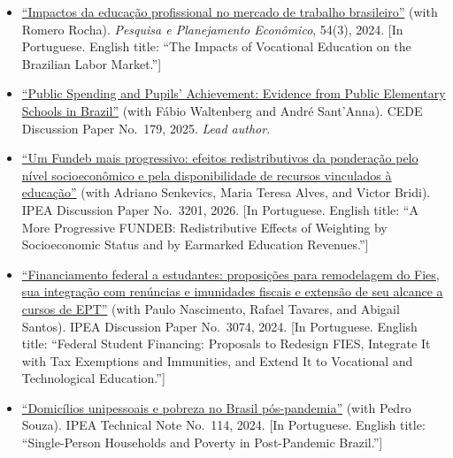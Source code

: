 \documentclass[11pt]{article}
\newenvironment{pubs}
  {\begin{itemize}[leftmargin=1.5em,labelsep=0em,label={},itemsep=6pt,parsep=0pt,topsep=2pt]
   \setlength{\itemindent}{-1.5em}}
  {\end{itemize}}
\begin{document}
\begin{pubs}
  \item \href{https://ppe.ipea.gov.br/index.php/ppe/article/view/2347}{``Impactos da educação profissional no mercado de trabalho brasileiro''}
        (with Romero Rocha). \textit{Pesquisa e Planejamento Econômico}, 54(3), 2024.
        {\small [In Portuguese. English title: ``The Impacts of Vocational Education on the Brazilian
        Labor Market.'']}
  \item \href{https://www.ie.ufrj.br/images/IE/grupos/cede/tds/\%5bTD\%20179\%5d\%20MACIEL,\%20B.\%20F._\%20SANT'ANNA,\%20A.A._\%20WALTENBERG,\%20F.(2025).\%20Public\%20spending\%20and\%20pupils\%E2\%80\%99\%20achievement_\%20Evidence\%20from\%20public\%20elementary\%20schools\%20in\%20Brazil.pdf}{``Public Spending and Pupils' Achievement: Evidence from Public Elementary Schools in Brazil''}
        (with Fábio Waltenberg and André Sant'Anna). CEDE Discussion Paper No.\ 179, 2025.
        \textit{Lead author.}
  \item \href{https://repositorio.ipea.gov.br/entities/publication/3bdf95c0-b7ce-4535-8897-84e6aaaad57a}{``Um Fundeb mais progressivo: efeitos redistributivos da ponderação pelo nível socioeconômico e pela disponibilidade de recursos vinculados à educação''}
        (with Adriano Senkevics, Maria Teresa Alves, and Victor Bridi).
        IPEA Discussion Paper No.\ 3201, 2026.
        {\small [In Portuguese. English title: ``A More Progressive FUNDEB: Redistributive Effects of
        Weighting by Socioeconomic Status and by Earmarked Education Revenues.'']}
  \item \href{https://repositorio.ipea.gov.br/entities/publication/c21a2df7-f16e-41e7-8417-d2fc37fb4fd3}{``Financiamento federal a estudantes: proposições para remodelagem do Fies, sua integração com renúncias e imunidades fiscais e extensão de seu alcance a cursos de EPT''}
        (with Paulo Nascimento, Rafael Tavares, and Abigail Santos).
        IPEA Discussion Paper No.\ 3074, 2024.
        {\small [In Portuguese. English title: ``Federal Student Financing: Proposals to Redesign FIES,
        Integrate It with Tax Exemptions and Immunities, and Extend It to Vocational and Technological
        Education.'']}
  \item \href{https://repositorio.ipea.gov.br/items/b5c10c30-ac96-45d4-a2e1-bbabbc9705b4}{``Domicílios unipessoais e pobreza no Brasil pós-pandemia''}
        (with Pedro Souza). IPEA Technical Note No.\ 114, 2024.
        {\small [In Portuguese. English title: ``Single-Person Households and Poverty in Post-Pandemic Brazil.'']}

\end{pubs}
\end{document}

